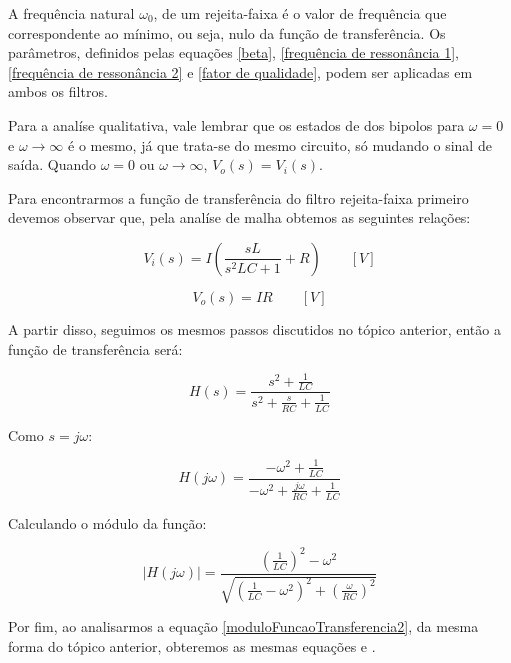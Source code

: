 A frequência natural $\omega_0$, de um rejeita-faixa é o valor de frequência que correspondente ao mínimo, ou seja, nulo da função de transferência. Os parâmetros, definidos pelas equações \ref{beta}, \ref{frequência de ressonância 1}, \ref{frequência de ressonância 2} e \ref{fator de qualidade}, podem ser aplicadas em ambos os filtros.

Para a analíse qualitativa, vale lembrar que os estados de dos bipolos para $\omega = 0$ e $\omega \rightarrow \infty $ é o mesmo, já que trata-se do mesmo circuito, só mudando o sinal de saída. Quando $\omega = 0$ ou $\omega \rightarrow \infty $, $V_o(s) = V_i(s)$.

Para encontrarmos a função de transferência do filtro rejeita-faixa primeiro devemos observar que, pela analíse de malha obtemos as seguintes relações:

\begin{equation}
	V_i(s) = I (\frac{sL}{s^2LC+1}+R) \qquad [V]
\end{equation}

\begin{equation}
	V_o(s) = IR \qquad [V]
\end{equation}

A partir disso, seguimos os mesmos passos discutidos no tópico anterior, então a função de transferência será:

\begin{equation}
	H(s) = \frac{s^2 + \frac{1}{LC}}{s^2 + \frac{s}{RC} + \frac{1}{LC}}
	\label{funcao tranferenci rejeita-faixa}
\end{equation}

Como $s=j\omega$:

\begin{equation}
	H(j\omega) = \frac{-\omega^2 + \frac{1}{LC}}{-\omega^2 + \frac{j\omega}{RC} + \frac{1}{LC}}
	\label{funcao tranferenci rejeita-faixa jw}
\end{equation}

Calculando o módulo da função:

\begin {equation}
|H(j \omega)| = \frac{ (\frac{1}{LC})^2 - \omega^2 }{ \sqrt{  ( \frac{ 1 }{LC} - \omega^2 )^2 + (\frac{\omega}{RC})^2} }
\label{moduloFuncaoTransferencia2}
\end {equation}

Por fim, ao analisarmos a equação \ref{moduloFuncaoTransferencia2}, da mesma forma do tópico anterior, obteremos as mesmas equações  e .

\pagebreak
